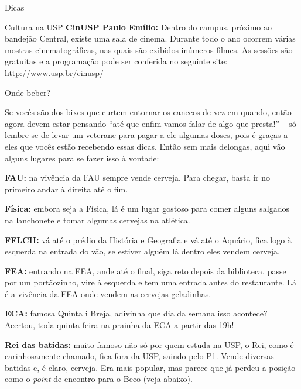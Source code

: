 \begin{secao}{Dicas}
\begin{subsecao}{Cultura na USP}
{\bf CinUSP Paulo Emílio:} Dentro do campus, próximo ao bandejão Central,
existe uma sala de cinema. Durante todo o ano ocorrem várias mostras
cinematográficas, nas quais são exibidos inúmeros filmes. As sessões são gratuitas
e a programação pode ser conferida no seguinte site: \url{http://www.usp.br/cinusp/}

\end{subsecao}

\begin{subsecao}{Onde beber?}
	
Se vocês são dos bixes que curtem entornar os canecos de vez em quando, então
agora devem estar pensando ``até que enfim vamos falar de algo que presta!'' --
só lembre-se de levar um veterane para pagar a ele algumas doses, pois é graças
a eles que vocês estão recebendo essas dicas. Então sem mais delongas, aqui vão
alguns lugares para se fazer isso à vontade:

{\bf FAU:} na vivência da FAU sempre vende cerveja. Para chegar, basta ir no 
primeiro andar à direita até o fim.

{\bf Física:} embora seja a Física, lá é um lugar gostoso para comer alguns
salgados na lanchonete e tomar algumas cervejas na atlética.

{\bf FFLCH:} vá até o prédio da História e Geografia e vá até o Aquário, fica 
logo à esquerda na entrada do vão, se estiver alguém lá dentro eles vendem cerveja.

{\bf FEA:} entrando na FEA, ande até o final, siga reto depois da biblioteca,
passe por um portãozinho, vire à esquerda e tem uma entrada antes do restaurante.
Lá é a vivência da FEA onde vendem as cervejas geladinhas.

{\bf ECA:} famosa Quinta i Breja, adivinha que dia da semana isso acontece?
Acertou, toda quinta-feira na prainha da ECA a partir das 19h!

{\bf Rei das batidas:} muito famoso não só por quem estuda na USP, o Rei,
como é carinhosamente chamado, fica fora da USP, saindo pelo P1. Vende
diversas batidas e, é claro, cerveja. Era mais popular, mas parece que já
perdeu a posição como o \textit{point} de encontro para o Beco (veja abaixo).



\end{subsecao}
\end{secao}
